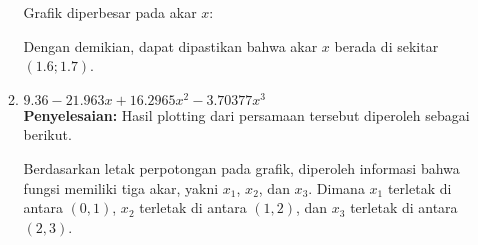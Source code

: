 \documentclass{article}
\newcommand{\penyelesaian}{\textbf{Penyelesaian: }}
\begin{document}
\begin{enumerate}
\begin{enumerate}
        Grafik diperbesar pada akar $x$:
        \begin{center}
        \end{center}
        Dengan demikian, dapat dipastikan bahwa akar $x$ berada di sekitar $(\num{1,6}; \num{1,7})$. \\

        \item $\num{9,36} - \num{21,963}x + \num{16,2965}x^2 - \num{3,70377}x^3$ \\
        \penyelesaian Hasil plotting dari persamaan tersebut diperoleh sebagai berikut.
        \begin{center}
        \end{center}
        Berdasarkan letak perpotongan pada grafik, diperoleh informasi bahwa fungsi memiliki tiga akar, yakni $x_1$, $x_2$, dan $x_3$. 
        Dimana $x_1$ terletak di antara $(0, 1)$, $x_2$ terletak di antara $(1, 2)$, dan $x_3$ terletak di antara $(2, 3)$. \\
    \end{enumerate}


\end{enumerate}
\end{document}
